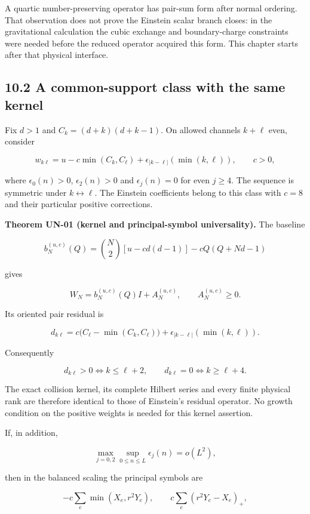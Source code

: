 \documentclass[a4paper,11pt]{article}
\numberwithin{equation}{section}
\begin{document}
A quartic number-preserving operator has pair-sum form after normal ordering. That observation does not prove the Einstein scalar branch closes: in the gravitational calculation the cubic exchange and boundary-charge constraints were needed before the reduced operator acquired this form. This chapter starts after that physical interface.

\hypertarget{a-common-support-class-with-the-same-kernel}{%
\subsection{10.2 A common-support class with the same kernel}\label{a-common-support-class-with-the-same-kernel}}

Fix \(d>1\) and \(C_k=(d+k)(d+k-1)\). On allowed channels \(k+\ell\) even, consider

\[
w_{k\ell}=u-c\min(C_k,C_\ell)+\epsilon_{|k-\ell|}(\min(k,\ell)),
\qquad c>0,
\]

where \(\epsilon_0(n)>0\), \(\epsilon_2(n)>0\) and \(\epsilon_j(n)=0\) for even \(j\geq4\). The sequence is symmetric under \(k\leftrightarrow\ell\). The Einstein coefficients belong to this class with \(c=8\) and their particular positive corrections.

\textbf{Theorem UN-01 (kernel and principal-symbol universality).} The baseline

\[
b_N^{(u,c)}(Q)=
\binom N2[u-cd(d-1)]-cQ(Q+Nd-1)
\]

gives

\[
W_N=b_N^{(u,c)}(Q)I+A_N^{(u,c)},\qquad A_N^{(u,c)}\geq0.
\]

Its oriented pair residual is

\[
d_{k\ell}=c\big(C_\ell-\min(C_k,C_\ell)\big)
+\epsilon_{|k-\ell|}(\min(k,\ell)).
\]

Consequently

\[
d_{k\ell}>0\iff k\leq\ell+2,\qquad
d_{k\ell}=0\iff k\geq\ell+4.
\]

The exact collision kernel, its complete Hilbert series and every finite physical rank are therefore identical to those of Einstein's residual operator. No growth condition on the positive weights is needed for this kernel assertion.

If, in addition,

\[
\max_{j=0,2}\sup_{0\leq n\leq L}\epsilon_j(n)=o(L^2),
\]

then in the balanced scaling the principal symbols are

\[
-c\sum_e\min(X_e,r^2Y_e),\qquad
c\sum_e(r^2Y_e-X_e)_+,
\]
\end{document}
